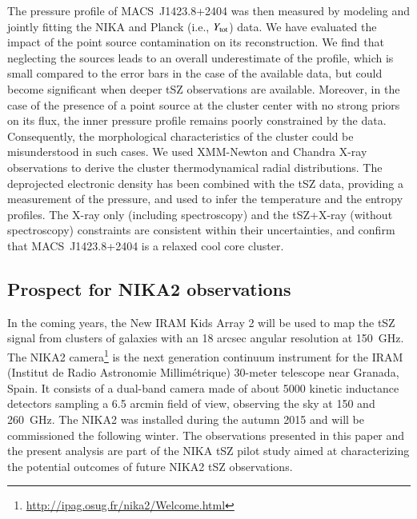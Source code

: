 \documentclass[traditabstract]{aa}
\begin{document}
The pressure profile of \mbox{MACS~J1423.8+2404} was then measured by modeling and jointly fitting the NIKA and Planck (i.e., $Y_{\rm tot}$) data. We have evaluated the impact of the point source contamination on its reconstruction. We find that neglecting the sources leads to an overall underestimate of the profile, which is small compared to the error bars in the case of the available data, but  could become significant when deeper tSZ observations are available. Moreover, in the case of the presence of a point source at the cluster center with no strong priors on its flux, the inner pressure profile remains poorly constrained by the data. Consequently, the morphological characteristics of the cluster could be misunderstood in such cases. We used XMM-Newton and Chandra X-ray observations to derive the cluster thermodynamical radial distributions. The deprojected electronic density has been combined with the tSZ data, providing a measurement of the pressure, and used to infer the temperature and the entropy profiles. The X-ray only (including spectroscopy) and the tSZ+X-ray (without spectroscopy) constraints are consistent within their uncertainties, and confirm that \mbox{MACS~J1423.8+2404} is a relaxed cool core cluster.

\subsection{Prospect for NIKA2 observations}
In the coming years, the New IRAM Kids Array 2 \citep[NIKA2][]{monfardini2014} will be used to map the tSZ signal from clusters of galaxies with an 18 arcsec angular resolution at 150~GHz. The NIKA2 camera\footnote{\url{http://ipag.osug.fr/nika2/Welcome.html}} is the next generation continuum instrument for the IRAM (Institut de Radio Astronomie Millim\'etrique) 30-meter telescope near Granada, Spain. It consists of a dual-band camera made of about 5000 kinetic inductance detectors sampling a 6.5 arcmin field of view, observing the sky at 150 and 260~GHz. The NIKA2 was installed during the autumn 2015 and will be commissioned  the following winter. The observations presented in this paper and the present analysis are part of the NIKA tSZ pilot study aimed at characterizing the potential outcomes of future NIKA2 tSZ observations.
\end{document}

